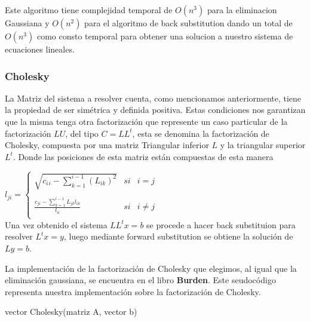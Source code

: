 \begin{center}
Este algoritmo tiene complejidad temporal de $O(n^{3})$ para la eliminacion Gaussiana y $O(n^{2})$ para el algoritmo de back substitution dando un total de $O(n^{3})$ como consto temporal para obtener una solucion a nuestro sistema de ecuaciones lineales.

\newpage
\subsubsection{Cholesky}
La Matriz del sistema a resolver cuenta, como mencionamos anteriormente, tiene la propiedad de ser simétrica y definida positiva. Estas condiciones nos garantizan que la misma tenga otra factorización que represente un caso particular de la factorización $LU$, del tipo $C=LL^{t}$, esta se denomina la factorización de Cholesky, compuesta por una matriz Triangular inferior $L$ y la triangular superior $L^{t}$. Donde las posiciones de esta matriz están compuestas de esta manera

$l_{ji} =
\left\{
    \begin{array}{lcc}
        \sqrt{c{_i}{_i} - \sum\limits_{k=1}^{i-1} (L_{ik})^2} & si & i = j \\
        \\ \frac{c_{ji} - \sum\limits_{k=1}^{i-1} L_{jk}l_{ik}}{l_{ii}} & si & i \neq j \\
    \end{array}
\right.$ \\

Una vez obtenido el sistema $LL^tx=b$ se procede a hacer back substituion para resolver $L^tx=y$, luego mediante forward substitution se obtiene la solución de $Ly=b$.

La implementación de la factorización de Cholesky que elegimos, al igual que la eliminación gaussiana, se encuentra en el libro \textbf{Burden}.
Este seudocódigo representa nuestra implementación sobre la factorización de Cholesky.

\begin{algorithm}
    \begin{algorithmic}[1]\parskip=2mm
        \caption{vector Cholesky(matriz A, vector b)}
        \\
        \\
        \\
        \\
        \\
        \\
    \end{algorithmic}
\end{algorithm}


\end{center}
